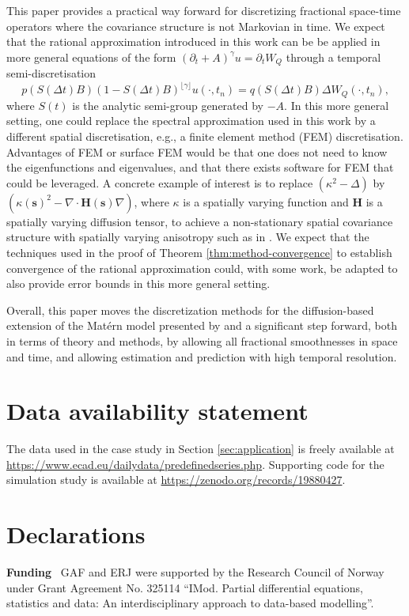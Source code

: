 \documentclass[12pt]{article} %
\begin{document}
This paper provides a practical way forward for discretizing fractional space-time operators where the covariance structure is not Markovian in time. We expect that the rational approximation introduced in this work can be be applied in more general equations of the form $(\partial_t + A)^{\gamma}u = \partial_t W_Q$ through a temporal semi-discretisation
\begin{equation*}
p(S(\Delta t)B)(1-S(\Delta t)B)^{\lfloor\gamma\rfloor} u(\cdot, t_n) = q(S(\Delta t)B)\Delta W_Q(\cdot,t_n),
\end{equation*}
where $S(t)$ is the analytic semi-group generated by $-A$. In this more general setting, one could replace the spectral approximation used in this work by a different spatial discretisation, e.g., a finite element method (FEM) discretisation. Advantages of FEM or surface FEM would be that one does not need to know the eigenfunctions and eigenvalues, and that there exists software for FEM that could be leveraged. A concrete example of interest is to replace $(\kappa^2-\Delta)$ by $(\kappa(\boldsymbol{s})^2-\nabla\cdot\mathbf{H}(\boldsymbol{s})\nabla)$, where $\kappa$ is a spatially varying function and $\mathbf{H}$ is a spatially varying diffusion tensor, to achieve a non-stationary spatial covariance structure with spatially varying anisotropy such as in \cite{fuglstad2015exploring,fuglstad2015does}.
We expect that the techniques used in the proof of Theorem \ref{thm:method-convergence} to establish convergence of the rational approximation could, with some work, be adapted to also provide error bounds in this more general setting.

Overall, this paper moves the discretization methods for the diffusion-based extension of the Matérn model presented by \citet{LindgrenBakka} and \citet{kirchner2022} a significant step forward, both in terms of theory and methods, by allowing all fractional smoothnesses in space and time, and allowing estimation and prediction with high temporal resolution.

\section{Data availability statement}\label{sec:data-availability} The data used in the case study in Section \ref{sec:application} is freely available at \url{https://www.ecad.eu/dailydata/predefinedseries.php}. Supporting code for the simulation study is available at \url{https://zenodo.org/records/19880427}.

\section{Declarations} 
\noindent
\textbf{Funding} \, GAF and ERJ were supported by the Research Council of Norway under Grant Agreement No. 325114 “IMod. Partial differential equations,
statistics and data: An interdisciplinary approach to data-based modelling”.
\end{document}
